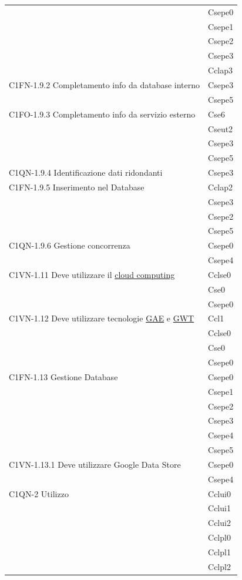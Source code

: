 \begin{footnotesize}
\begin{longtable}[!h]{|l|l|}
& Csepe0\\
& Csepe1\\
& Csepe2\\
& Csepe3\\
& Cclap3\\\hline 
C1FN-1.9.2 Completamento info da database interno & Csepe3 \\
& Csepe5 \\\hline   
C1FO-1.9.3 Completamento info da servizio esterno & Cse6\\
& Cseut2\\
& Csepe3\\
& Csepe5\\\hline  
C1QN-1.9.4 Identificazione dati ridondanti & Csepe3\\\hline                                                                                       
C1FN-1.9.5 Inserimento nel Database & Cclap2\\
& Csepe3\\
& Csepe2\\
& Csepe5\\\hline  
C1QN-1.9.6 Gestione concorrenza & Csepe0\\
& Csepe4\\\hline    
C1VN-1.11 Deve utilizzare il \underline{cloud computing} & Cclse0\\
& Cse0\\
& Csepe0\\\hline    
C1VN-1.12 Deve utilizzare tecnologie \underline{GAE} e \underline{GWT} & Ccl1\\
& Cclse0\\
& Cse0\\
& Csepe0\\\hline                                 
C1FN-1.13 Gestione Database & Csepe0\\
& Csepe1\\
& Csepe2\\
& Csepe3\\
& Csepe4\\
& Csepe5\\\hline   
C1VN-1.13.1 Deve utilizzare Google Data Store & Csepe0\\
& Csepe4\\\hline      
C1QN-2 Utilizzo & Cclui0 \\
& Cclui1\\
& Cclui2\\
& Cclpl0\\
& Cclpl1\\
& Cclpl2\\

\end{longtable}
\end{footnotesize}
